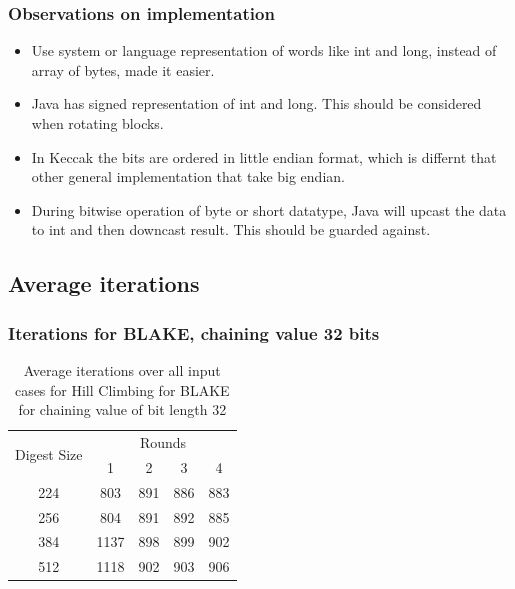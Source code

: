 \documentclass{beamer}
\begin{document}
\begin{frame}
\frametitle{Observations on implementation}
\begin{itemize}
\item Use system or language representation of words like int and long, instead of array of bytes, made
it easier.
\item Java has signed representation of int and long. This should be considered when rotating blocks.
\item In Keccak the bits are ordered in little endian format, which is differnt that other general
implementation that take big endian.
\item During bitwise operation of byte or short datatype, Java will upcast the data to int and then
downcast result. This should be guarded against.
\end{itemize}
\end{frame}

\subsection{Average iterations}

\begin{frame}
\frametitle{Iterations for BLAKE, chaining value 32 bits}
\begin{table}
  \begin{center}
    \begin{tabular}{ | c | c | c | c | c | } \hline
     \multirow{2}{*}{Digest Size} & \multicolumn{4}{c|}{Rounds} \\ \cline{2-5}
                                  & 1    & 2   & 3   & 4   \\ \hline
     224                          & 803  & 891 & 886 & 883 \\ \hline
     256                          & 804  & 891 & 892 & 885 \\ \hline
     384                          & 1137 & 898 & 899 & 902 \\ \hline
     512                          & 1118 & 902 & 903 & 906 \\ \hline
    \end{tabular}
    \caption{Average iterations over all input cases for Hill Climbing for BLAKE for chaining value
    of bit length 32}
  \end{center}
\end{table}
\end{frame}
\end{document}
